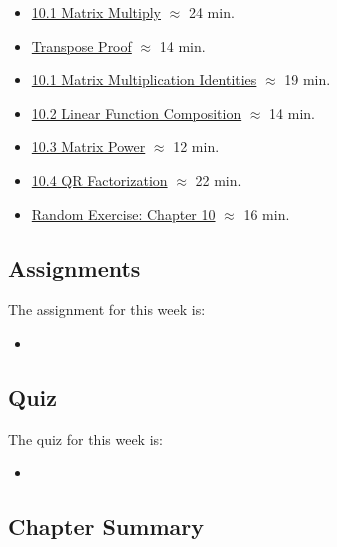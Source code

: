 \begin{itemize}
    \item \href{https://applied.cs.colorado.edu/mod/hvp/view.php?id=50788}{10.1 Matrix Multiply} $\approx$ 24 min.
    \item \href{https://applied.cs.colorado.edu/mod/hvp/view.php?id=50789}{Transpose Proof} $\approx$ 14 min.
    \item \href{https://applied.cs.colorado.edu/mod/hvp/view.php?id=50790}{10.1 Matrix Multiplication Identities} $\approx$ 19 min.
    \item \href{https://applied.cs.colorado.edu/mod/hvp/view.php?id=50791}{10.2 Linear Function Composition} $\approx$ 14 min.
    \item \href{https://applied.cs.colorado.edu/mod/hvp/view.php?id=50792}{10.3 Matrix Power} $\approx$ 12 min.
    \item \href{https://applied.cs.colorado.edu/mod/hvp/view.php?id=50793}{10.4 QR Factorization} $\approx$ 22 min.
    \item \href{https://applied.cs.colorado.edu/mod/hvp/view.php?id=50794}{Random Exercise: Chapter 10} $\approx$ 16 min.
\end{itemize}

\subsection{Assignments}

The assignment for this week is:

\begin{itemize}
    \item {}
\end{itemize}

\subsection{Quiz}

The quiz for this week is:

\begin{itemize}
    \item {}
\end{itemize}

\subsection{Chapter Summary}

